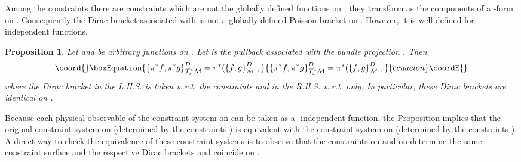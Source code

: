 \documentclass[a4paper,11pt]{amsart}
\newtheorem{prop}[thm]{Proposition}
\numberwithin{thm}{section} %
\numberwithin{equation}{section} %
\numberwithin{figure}{section} %
\providecommand{\pb}[2]{\left\{{}#1{},{}#2{}\right\}}
\renewcommand{\:}{{\rm\, :\,}}
\def\mod{{\mathcal T}^*_\omega}
\def\manM{{\mathcal M}}
\begin{document}
Among the constraints \coordHE{} there are constraints
\coordHE{} which are not the globally defined functions on \myHighlight{$\mod\manM$}\coordHE{};
they transform as the components of a \coordHE{}-form on \myHighlight{$\manM$}\coordHE{}.
Consequently the Dirac bracket associated with \coordHE{}
is not a globally defined Poisson bracket on \myHighlight{$\mod\manM$}\coordHE{}.
However, it is well defined for \coordHE{}-independent functions.
\begin{prop} Let \coordHE{} and \coordHE{} be arbitrary functions on \myHighlight{$\manM$}\coordHE{}.
Let \myHighlight{$\pi^*$}\coordHE{} is the  pullback associated with the bundle projection
\myHighlight{$\pi \: \mod\manM\to  \manM$}\coordHE{}. Then
\begin{equation}\coord{}\boxEquation{
  \label{eq:coincidence}
\pb{\pi^* f}{\pi^* g}_{\mod\manM}^{D}=
\pi^*(\pb{f}{g}_{\manM}^D\,,
}{
  \pb{\pi^* f}{\pi^* g}_{\mod\manM}^{D}=
\pi^*(\pb{f}{g}_{\manM}^D\,,
}{ecuacion}\coordE{}\end{equation}
where the Dirac bracket in the L.H.S. is taken w.r.t. the
constraints \coordHE{} and in the R.H.S. w.r.t. \myHighlight{$\theta_\alpha$}\coordHE{}
only. In particular, these Dirac brackets are identical on \myHighlight{$\Sigma \subset 
\manM$}\coordHE{}.
\end{prop}
Because each physical observable of the constraint system on
\myHighlight{$\mod\manM$}\coordHE{} can be taken as a \coordHE{}-independent function, the Proposition
implies that the original constraint system on \myHighlight{$\manM$}\coordHE{} (determined by
the constraints \myHighlight{$\theta_\alpha$}\coordHE{}) is equivalent with the constraint
system on \myHighlight{$\mod\manM$}\coordHE{} (determined by the constraints \coordHE{}).
A direct way to check the equivalence of these constraint systems is to
observe that the constraints \coordHE{} on \myHighlight{$\mod\manM$}\coordHE{}  and \myHighlight{$\theta_\alpha$}\coordHE{}
on \myHighlight{$\manM$}\coordHE{} determine the same constraint surface \myHighlight{$\Sigma$}\coordHE{} and
the respective Dirac brackets \myHighlight{$\pb{}{}_{\mod\manM}^{D}$}\coordHE{} and
\myHighlight{$\pb{}{}_{\manM}^D$}\coordHE{} coincide on \myHighlight{$\Sigma$}\coordHE{}.
\end{document}

